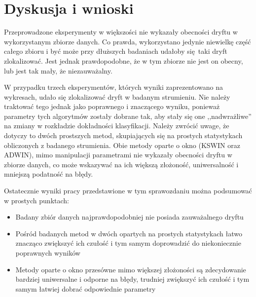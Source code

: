 \documentclass{classrep}
\begin{document}
    \section{Dyskusja i wnioski} {
        Przeprowadzone eksperymenty w większości nie wykazały obecności dryftu w wykorzystanym
        zbiorze danych. Co prawda, wykorzystano jedynie niewielkę część całego zbioru i być może
        przy dłuższych badaniach udałoby się taki dryft zlokalizować. Jest jednak prawdopodobne, że
        w tym zbiorze nie jest on obecny, lub jest tak mały, że niezauważalny.

        W przypadku trzech eksperymentów, których wyniki zaprezentowano na wykresach, udało się
        zlokalizować dryft w badanym strumieniu. Nie należy traktować tego jednak jako poprawnego i
        znaczącego wyniku, ponieważ parametry tych algorytmów zostały dobrane tak, aby stały się one
        ,,nadwrażliwe'' na zmiany w rozkładzie dokładności klasyfikacji. Należy zwrócić uwage, że
        dotyczy to dwóch prostszych metod, skupiających się na prostych statystykach obliczonych z
        badanego strumienia. Obie metody oparte o okno (KSWIN oraz ADWIN), mimo manipulacji
        parametrami nie wykazały obecności dryftu w zbiorze danych, co może wskazywać na ich większą
        złożoność, uniwersalność i mniejszą podatność na błędy.

        Ostatecznie wyniki pracy przedstawione w tym sprawozdaniu można podsumować w prostych
        punktach:
        \begin{itemize}
            \item Badany zbiór danych najprawdopodobniej nie posiada zauważalnego dryftu
            \item Pośród badanych metod w dwóch opartych na prostych statystykach łatwo znacząco
                zwiększyć ich czułość i tym samym doprowadzić do niekoniecznie poprawnych wyników
            \item Metody oparte o okno przesówne mimo większej złożoności są zdecydowanie bardziej
                uniwersalne i odporne na błędy, trudniej zwiększyć ich czułość i tym samym łatwiej
                dobrać odpowiednie parametry
        \end{itemize}
    }
\end{document}

